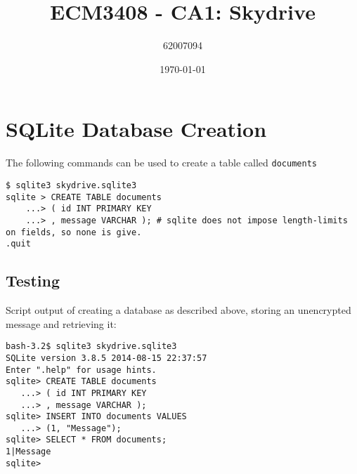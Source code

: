 \documentclass[11pt]{article}
\begin{document}
    \lstset{
    	basicstyle=\ttfamily,
    	breaklines=true,
		numbers=left,
    }
    \title{ECM3408 - CA1: Skydrive}
    \author{62007094}
    \date{\today}
    \maketitle
    
    \section{SQLite Database Creation}
    The following commands can be used to create a table called \texttt{documents}
    
    \begin{lstlisting}
$ sqlite3 skydrive.sqlite3
sqlite > CREATE TABLE documents
    ...> ( id INT PRIMARY KEY  
    ...> , message VARCHAR ); # sqlite does not impose length-limits on fields, so none is give.
.quit
    \end{lstlisting}
	
	\subsection{Testing}
	Script output of creating a database as described above, storing an unencrypted message and retrieving it:
	\begin{lstlisting}
bash-3.2$ sqlite3 skydrive.sqlite3
SQLite version 3.8.5 2014-08-15 22:37:57
Enter ".help" for usage hints.
sqlite> CREATE TABLE documents
   ...> ( id INT PRIMARY KEY
   ...> , message VARCHAR );
sqlite> INSERT INTO documents VALUES
   ...> (1, "Message");
sqlite> SELECT * FROM documents;
1|Message
sqlite>
\end{lstlisting}
	
\end{document}
